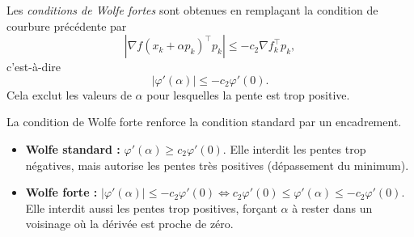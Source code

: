 \begin{definition}
Les \emph{conditions de Wolfe fortes} sont obtenues en remplaçant la
condition de courbure précédente par
\begin{equation}
    |\nabla f(x_k + \alpha p_k)^\top p_k|
    \le -c_2 \nabla f_k^\top p_k,
\end{equation}
c’est-à-dire
\[
    |\varphi'(\alpha)| \le -c_2 \varphi'(0).
\]
Cela exclut les valeurs de $\alpha$ pour lesquelles la pente est trop positive.
\end{definition}

\begin{remarque}
    La condition de Wolfe forte renforce la condition standard par un encadrement.
    \begin{itemize}
        \item \textbf{Wolfe standard :} $\varphi'(\alpha) \ge c_2 \varphi'(0)$. Elle interdit les pentes trop négatives, mais autorise les pentes très positives (dépassement du minimum).
        \item \textbf{Wolfe forte :} $|\varphi'(\alpha)| \le -c_2 \varphi'(0) \iff c_2 \varphi'(0) \le \varphi'(\alpha) \le -c_2 \varphi'(0)$. Elle interdit aussi les pentes trop positives, forçant $\alpha$ à rester dans un voisinage où la dérivée est proche de zéro.
    \end{itemize}
\end{remarque}

